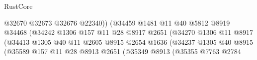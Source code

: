 \begin{lexlean}{RustCore}
\begin{coremodule}
                                                  @32670
                                                  @32673
                                                  @32676
                                                  @22340))
                                              (@34459
                                                @1481
                                                @11
                                                @40
                                                @5812
                                                @8919
                                                @34468
                                                (@34242
                                                  @1306
                                                  @157
                                                  @11
                                                  @28
                                                  @8917
                                                  @2651
                                                  (@34270
                                                    @1306
                                                    @11
                                                    @8917
                                                    (@34413
                                                      @1305
                                                      @40
                                                      @11
                                                      @2605
                                                      @8915
                                                      @2654
                                                      @1636
                                                      (@34237
                                                        @1305
                                                        @40
                                                        @8915
                                                        (@35589
                                                          @157
                                                          @11
                                                          @28
                                                          @8913
                                                          @2651
                                                          (@35349
                                                            @8913
                                                            (@35355
                                                              @7763
                                                              @2784

\end{coremodule}
\end{lexlean}
